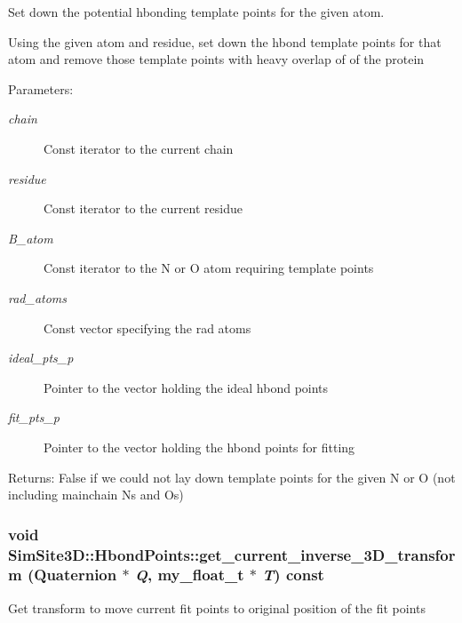 Set down the potential hbonding template points for the given atom. 

Using the given atom and residue, set down the hbond template points for that atom and remove those template points with heavy overlap of of the protein

\begin{Desc}
\item[Parameters:]
\begin{description}
\item[{\em chain}]Const iterator to the current chain \item[{\em residue}]Const iterator to the current residue \item[{\em B\_\-atom}]Const iterator to the N or O atom requiring template points \item[{\em rad\_\-atoms}]Const vector specifying the rad atoms \item[{\em ideal\_\-pts\_\-p}]Pointer to the vector holding the ideal hbond points \item[{\em fit\_\-pts\_\-p}]Pointer to the vector holding the hbond points for fitting \end{description}
\end{Desc}
\begin{Desc}
\item[Returns:]False if we could not lay down template points for the given N or O (not including mainchain Ns and Os) \end{Desc}
\subsubsection{\setlength{\rightskip}{0pt plus 5cm}void SimSite3D::Hbond\-Points::get\_\-current\_\-inverse\_\-3D\_\-transform (Quaternion $\ast$ {\em Q}, my\_\-float\_\-t $\ast$ {\em T}) const\hspace{0.3cm}{\tt  [inline]}}\label{classSimSite3D_1_1HbondPoints_315af5cac9bd9bbd51d52bd2539ed075}


Get transform to move current fit points to original position of the fit points 
